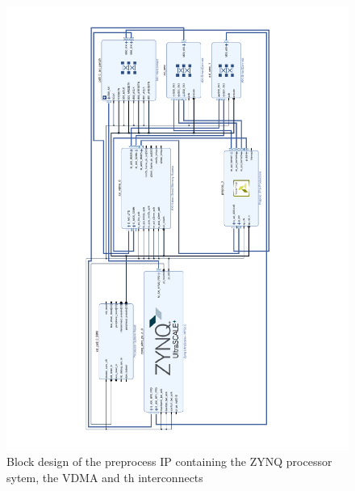 \begin{figure}
    \centering
    \includegraphics[width=\linewidth]{assets/PreProcess_design.pdf}
    \caption{Block design of the preprocess IP containing the ZYNQ processor sytem, the VDMA and th interconnects}
    \label{fig:block_preproc}
\end{figure}

